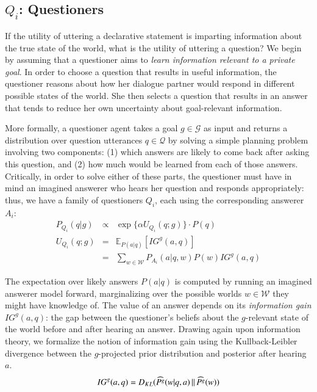 \documentclass[11pt, floatsintext]{apa6}
\newcommand{\KL}[2]{\ensuremath{D_{KL}({#1}\, \| \, {#2})}}
\newcommand{\E}[2]{\ensuremath{\mathbb{E}_{#1}\left [#2 \right]}}
\begin{document}
\subsection{$Q_i$: Questioners}

If the utility of uttering a declarative statement is imparting information about the true state of the world, what is the utility of uttering a question? We begin by assuming that a questioner aims to \emph{learn information relevant to a private goal}.
%
In order to choose a question that results in useful information, the questioner reasons about how her dialogue partner would respond in different possible states of the world. She then selects a question that results in an answer that tends to reduce her own uncertainty about goal-relevant information.
%


More formally, a questioner agent takes a goal $g \in \mathcal{G}$ as input and returns a distribution over question utterances $q \in \mathcal{Q}$ by solving a simple planning problem involving two components: (1) which answers are likely to come back after asking this question, and (2) how much would be learned from each of those answers. Critically, in order to solve either of these parts, the questioner must have in mind an imagined answerer who hears her question and responds appropriately: thus, we have a family of questioners $Q_i$, each using the corresponding answerer $A_i$:
%
$$
\begin{array}{lcl}
P_{Q_i}(q|g)  & \propto & \exp\{\alpha U_{Q_i}(q;g)\} \cdot P(q)\\
U_{Q_i}(q;g) & = & \E{P(a|q)}{IG^g(a,q)} \\
	 & = & \sum_{w\in\mathcal{W}} P_{A_i}(a|q,w)P(w) IG^g(a,q)
\end{array}
$$
%

The expectation over likely answers $P(a|q)$ is computed by running an imagined answerer model forward, marginalizing over the possible worlds $w \in\mathcal{W}$ they might have knowledge of. The value of an answer depends on its \emph{information gain} $IG^g(a,q)$: the gap between the questioner's beliefs about the $g$-relevant state of the world before and after hearing an answer. Drawing again upon information theory, we formalize the notion of information gain using the Kullback-Leibler divergence between the $g$-projected prior distribution and posterior after hearing $a$.
%
$$
IG^g(a,q) = \KL{\widehat{P^g}(w|q, a)}{\widehat{P^g}(w)}\\
$$
%
\end{document}
